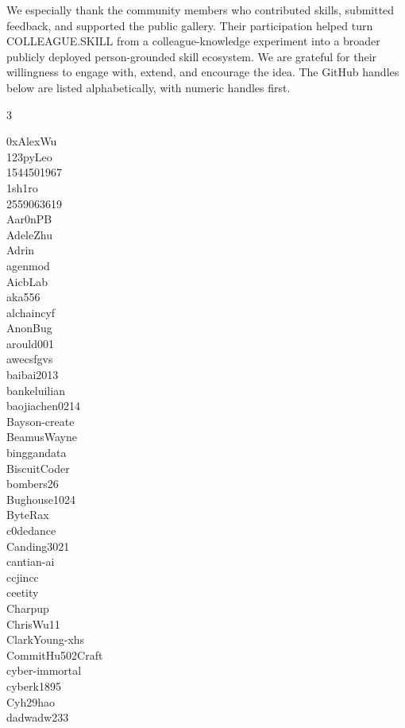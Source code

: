 \documentclass{llmxive}
\providecommand{\system}{\textsc{COLLEAGUE.SKILL}\xspace}
\begin{document}
We especially thank the community members who contributed skills, submitted feedback, and supported the public gallery. Their participation helped turn \system from a colleague-knowledge experiment into a broader publicly deployed person-grounded skill ecosystem. We are grateful for their willingness to engage with, extend, and encourage the idea. The GitHub handles below are listed alphabetically, with numeric handles first.

\begingroup
\scriptsize
\setlength{}{1.4em}
\begin{multicols}{3}

0xAlexWu\\
123pyLeo\\
1544501967\\
1sh1ro\\
2559063619\\
Aar0nPB\\
AdeleZhu\\
Adrin\\
agenmod\\
AicbLab\\
aka556\\
alchaincyf\\
AnonBug\\
arould001\\
awecsfgvs\\
baibai2013\\
bankeluilian\\
baojiachen0214\\
Bayson-create\\
BeamusWayne\\
binggandata\\
BiscuitCoder\\
bombers26\\
Bughouse1024\\
ByteRax\\
c0dedance\\
Canding3021\\
cantian-ai\\
ccjincc\\
ceetity\\
Charpup\\
ChrisWu11\\
ClarkYoung-xhs\\
CommitHu502Craft\\
cyber-immortal\\
cyberk1895\\
Cyh29hao\\
dadwadw233\\

\end{multicols}
\end{document}
